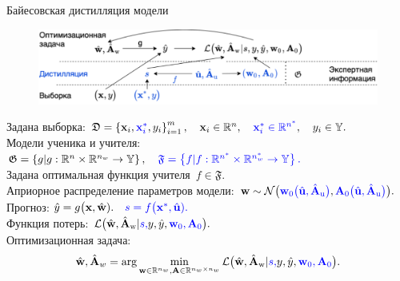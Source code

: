 \documentclass[10pt,pdf,hyperref={unicode}]{beamer}
\begin{document}
\begin{frame}{Байесовская дистилляция модели}
\justifying
\begin{figure}[h!]
\includegraphics[width=1.0\textwidth]{slides/figures/introdigram_large}
\end{figure}

Задана выборка:
$
	\mathfrak{D} = \left\{\mathbf{x}_i, {\color{blue}\mathbf{x}_i^{*}}, y_i\right\}_{i=1}^{m}, 
	\quad \mathbf{x}_{i} \in \mathbb{R}^{n}, 
	{\color{blue}\quad \mathbf{x}_{i}^{*} \in \mathbb{R}^{n^{*}}},
	\quad y_i \in \mathbb{Y}.
$\\[1mm]
Модели ученика и учителя:
$
    \mathfrak{G} = \left\{g | g : \mathbb{R}^{n}\times \mathbb{R}^{n_{w}} \to \mathbb{Y} \right\},
{\color{blue}
    \quad \mathfrak{F} = \left\{f | f : \mathbb{R}^{n^{*}}\times \mathbb{R}^{n_{w}^{*}} \to \mathbb{Y} \right\}.
}
$\\[1mm]
{\color{blue}
Задана оптимальная функция учителя~$f \in \mathfrak{F}.$
}
\\[1mm]
Априорное распределение параметров модели:
$
    \mathbf{w} \sim \mathcal{N}\bigr({\color{blue}\mathbf{w}_0\bigr(\hat{\mathbf{u}}, \hat{\mathbf{A}}_{\text{u}}\bigr)}, {\color{blue}\mathbf{A}_0\bigr(\hat{\mathbf{u}}, \hat{\mathbf{A}}_{\text{u}}\bigr)}\bigr).
$\\[1mm]
Прогноз:
$
    \hat{y} = g\bigr(\mathbf{x}, \hat{\mathbf{w}}).
{\color{blue}
    \quad
    s = f\bigr(\mathbf{x}^{*}, \hat{\mathbf{u}}).
}
$\\[1mm]
Функция потерь:
$
    \mathcal{L}\bigr(\hat{\mathbf{w}},\hat{\mathbf{A}}_{\text{w}}|{\color{blue} s, }y, \hat{y}, {\color{blue}\mathbf{w}_0, \mathbf{A}_0}\bigr).
$\\[1mm]
Оптимизационная задача:
\[
    \hat{\mathbf{w}}, \hat{\mathbf{A}}_{w} = \arg \min_{\mathbf{w} \in \mathbb{R}^{n_{w}}, \mathbf{A} \in \mathbb{R}^{n_{w}\times n_{w}}} \mathcal{L}\bigr(\hat{\mathbf{w}},\hat{\mathbf{A}}_{\text{w}}|{\color{blue} s, }y, \hat{y}, {\color{blue}\mathbf{w}_0, \mathbf{A}_0}\bigr).
\]
\end{frame}
\end{document}
